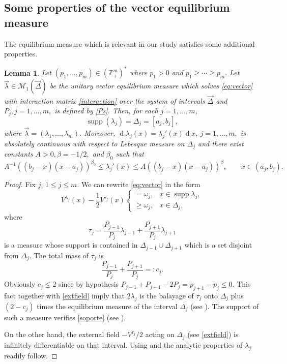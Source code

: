 \documentclass{amsart}
\numberwithin{equation}{section}
\newtheorem{lemma}[theorem]{Lemma}
\theoremstyle{definition}
\DeclareMathOperator{\D}{d}        %
\DeclareMathOperator{\supp}{supp}  %
\newcommand{\ZZ}{\mathbb{Z}}      %
\begin{document}
\subsection{Some properties of the vector equilibrium measure}

The equilibrium measure which is relevant in our study satisfies some additional properties.

\begin{lemma}
    \label{soportecompleto}
    Let $ (p_1,\ldots,p_m) \in (\ZZ_+^m)^*$ where $p_1 > 0$ and $p_1 \geq \cdots \geq p_m.$  Let $\vec{\lambda} \in \mathcal{M}_1(\vec{\Delta})$ be the unitary vector equilibrium measure which solves \eqref{eq:vector}  with interaction matrix \eqref{interaction}  over the system of intervals $\vec{\Delta}$ and $P_j, j=1,\ldots,m,$ is defined by \eqref{Ps}. Then, for each $j=1,\ldots, m$,
    \begin{equation}
    	\label{soporte}
    	\supp (\lambda_j) = \Delta_j = [a_j,b_j],
    \end{equation}
    where $\vec{\lambda}= (\lambda_1,\ldots,\lambda_m)$. Moreover, $\D \lambda_j(x) = \lambda_j'(x) \D x$, $j=1,\ldots,m,$ is absolutely continuous with respect to  Lebesque measure on $\Delta_j$ and there exist constants  $A> 0, \beta =-1/2,$ and $\beta_0$ such that
	\begin{equation}
		\label{cond:a*}
		A^{-1}((b_j-x)(x-a_j))^{\beta_0}\leq \lambda_j'(x) \leq A((b_j-x)(x-a_j))^\beta, \qquad x \in (a_j,b_j).
	\end{equation}
\end{lemma}

\begin{proof}
    Fix $j$, $1\leq j \leq m$. We can rewrite \eqref{eq:vector} in the form
    \begin{equation}
        \label{extfield}
        V^{\lambda_j}(x)  - \frac{1}{2} V^{\tau_j}(x)
        \begin{cases}
            =\omega_j, & x\in\supp \lambda_j,\\
            \geq \omega_j, & x\in \Delta_j,
        \end{cases}
    \end{equation}
where
\[ \tau_j = \frac{P_{j-1}}{P_j} \lambda_{j-1}+ \frac{P_{j+1}}{P_j} \lambda_{j+1}
\]
is a measure whose support is contained in $\Delta_{j-1} \cup \Delta_{j+1} $ which is a set disjoint from $\Delta_j$. The total mass of $\tau_j$ is
\[ \frac{P_{j-1}}{P_j} + \frac{P_{j+1}}{P_j} =: c_j.
\]
Obviously $c_j \leq 2$ since by hypothesis $P_{j-1} + P_{j+1} - 2P_j = p_{j+1} - p_j \leq 0$. This fact together with \eqref{extfield} imply that $2\lambda_j$ is the balayage of $\tau_j$ onto $\Delta_j$ plus $(2-c_j)$ times the equilibrium measure of the interval $\Delta_j$ (see  \cite[Ex. 4.8, pg.118]{SaffT}). The support of such a measure verifies \eqref{soporte} (see  \cite[Cor. 4.12, pg.122]{SaffT}).



On the other hand, the external field $-V^{\tau_j}/2$ acting on $\Delta_j$  (see \eqref{extfield}) is infinitely  differentiable on that interval. Using \cite[Theorem 1.34]{DKL} and \cite[Lemma 4]{KD} the analytic
properties  of $\lambda_j$ readily follow.\end{proof}
\end{document}
